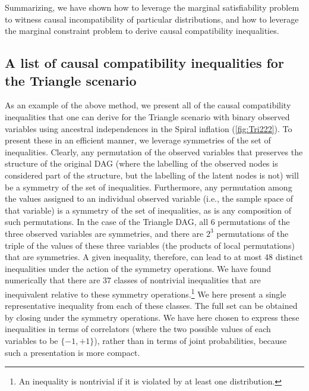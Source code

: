 \documentclass[aps,english,superscriptaddress,onecolumn,twoside,longbibliography,pra,floatfix,fleqn,nofootinbib]{revtex4-1}%
\theoremstyle{definition}
\newcounter{example}[section]
\begin{document}
Summarizing, we have shown how to leverage the marginal satisfiability problem to witness causal incompatibility of particular distributions, and how to leverage the marginal constraint problem to derive causal compatibility inequalities.


\subsection{A list of causal compatibility inequalities for the Triangle scenario}
\label{sec:CCineqs}

\color{blue}
As an example of the above method, we present all of the causal compatibility inequalities that one can derive for the Triangle scenario with binary observed variables using ancestral independences in the Spiral inflation (\cref{fig:Tri222}). 
 To present these in an efficient manner, we leverage symmetries of the set of inequalities.  Clearly, any permutation of the observed variables that preserves the structure of the original DAG (where the labelling of the observed nodes is considered part of the structure, but the labelling of the latent nodes is not) will be a symmetry of the set of inequalities.  Furthermore, any permutation among the values assigned to an individual observed variable (i.e., the sample space of that variable) is a symmetry of the set of inequalities, as is any composition of such permutations. 
In the case of the Triangle DAG, all 6 permutations of the three observed variables are symmetries, and there are $2^3$ permutations of the triple of the values of these three variables (the products of local permutations) that are symmetries.  A given inequality, therefore, can lead to at most 48 distinct inequalities under the action of the symmetry operations.  We have found numerically that there are 37 classes of nontrivial inequalities that are inequivalent relative to these symmetry operations.\footnote{An inequality is nontrivial if it is violated by at least one distribution.} We here present a single representative inequality from each of these classes.  The full set can be obtained by closing under the symmetry operations.  We have here chosen to express these inequalities in terms of correlators (where the two possible values of each variables to be $\{-1,+1\}$), rather than in terms of joint probabilities, because such a presentation is more compact.
\end{document}

